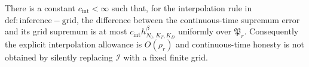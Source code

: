 There is a constant \(c_{\mathrm{int}}<\infty\) such that, for the interpolation rule in \(\mathrm{def:inference-grid}\), the difference between the continuous-time supremum error and its grid supremum is at most \(c_{\mathrm{int}}h_{N_0,K_T,K_D}^\beta\) uniformly over \(\mathfrak P_r\). Consequently the explicit interpolation allowance is \(O(\rho_r)\) and continuous-time honesty is not obtained by silently replacing \(\mathcal I\) with a fixed finite grid.
